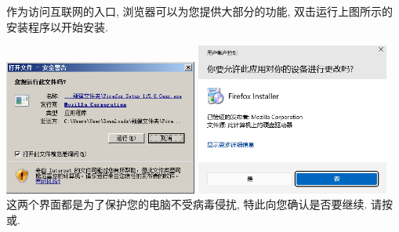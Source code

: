 作为访问互联网的入口, 浏览器可以为您提供大部分的功能, 双击运行上图所示的安装程序以开始安装. 

\includegraphics[width=2.5in]{media/image4.png}
\includegraphics[width=2.5in]{media/windows-uac-dialog-win11.png} \\
这两个界面都是为了保护您的电脑不受病毒侵扰, 特此向您确认是否要继续. 请按或. 

\newpage

